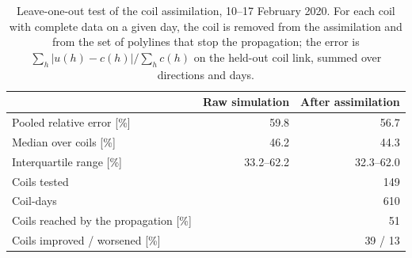 \begin{table}[htbp]
\centering
\caption{Leave-one-out test of the coil assimilation, 10--17 February 2020. For each coil with complete data on a given day, the coil is removed from the assimilation and from the set of polylines that stop the propagation; the error is $\sum_h|u(h)-c(h)|/\sum_h c(h)$ on the held-out coil link, summed over directions and days.}
\label{tab:loo}
\begin{tabular}{@{}lrr@{}}
\toprule
 & Raw simulation & After assimilation \\
\midrule
Pooled relative error [\%] & 59.8 & 56.7 \\
Median over coils [\%] & 46.2 & 44.3 \\
Interquartile range [\%] & 33.2--62.2 & 32.3--62.0 \\
\midrule
Coils tested & \multicolumn{2}{r}{149} \\
Coil-days & \multicolumn{2}{r}{610} \\
Coils reached by the propagation [\%] & \multicolumn{2}{r}{51} \\
Coils improved / worsened [\%] & \multicolumn{2}{r}{39 / 13} \\
\bottomrule
\end{tabular}
\end{table}
